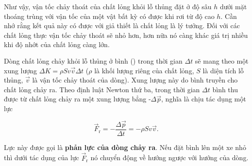 
Như vậy, vận tốc chảy thoát của chất lỏng khỏi lỗ thủng đặt ở độ sâu $h$ dưới mặt thoáng trùng với vận tốc của một vật bất kỳ có được khi rơi từ độ cao $h$. Cần nhớ rằng kết quả này có được với giả thiết là chất lỏng là lý tưởng. Đối với các chất lỏng thực vận tốc chảy thoát sẽ nhỏ hơn, hơn nữa nó càng khác giá trị  nhiều khi độ nhớt của chất lỏng càng lớn.


Dòng chất lỏng chảy khỏi lỗ thủng ở bình () trong thời gian $\Delta t$ sẽ mang theo một xung lượng $\Delta K=\rho Sv\vec{v}\Delta t$ ($\rho$ là khối lượng riêng của chất lỏng, $S$ là diện tích lỗ thủng, $\vec{v}$ là vận tốc chảy thoát của dòng). Xung lượng này do bình truyền cho chất lỏng chảy ra. Theo định luật Newton thứ ba, trong thời gian $\Delta t$ bình thu được từ chất lỏng chảy ra một xung lượng bẳng -$\Delta\vec{p}$, nghĩa là chịu tác dụng một lực

\begin{equation}\label{eq:9_7}
	\vec{F}_{\text{r}} = -\frac{\Delta\vec{p}}{\Delta t} = -\rho Sv\vec{v}.
\end{equation}
\noindent


Lực này được gọi là \textbf{phản lực của dòng chảy ra}. Nếu đặt bình lên một xe nhỏ thì dưới tác dụng của lực $\vec{F}_{\text{r}}$ nó chuyển động về hướng ngược với hướng của dòng.

